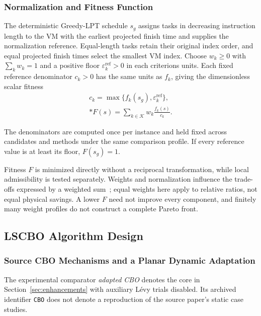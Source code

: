 \documentclass[pdflatex,onecolumn,sn-mathphys-num]{sn-jnl}
\begin{document}
\begin{samepage}
\subsubsection{Normalization and Fitness Function}\label{sec:fitness}
The deterministic Greedy-LPT schedule $s_g$ assigns tasks in decreasing instruction length to the VM with the earliest projected finish time and supplies the normalization reference. Equal-length tasks retain their original index order, and equal projected finish times select the smallest VM index. Choose $w_k\geq0$ with $\sum_k w_k=1$ and a positive floor $\varepsilon_k^{\mathrm{ref}}>0$ in each criterion\textquotesingle s units. Each fixed reference denominator $c_k>0$ has the same units as $f_k$, giving the dimensionless scalar fitness
\begin{gather}
c_k=\max\{f_k(s_g),\varepsilon_k^{\mathrm{ref}}\},\label{eq:reference}\\*
F(s)=\sum_{k\in\mathcal{K}}w_k\frac{f_k(s)}{c_k}.\label{eq:objective}
\end{gather}
\end{samepage}

The denominators are computed once per instance and held fixed across candidates and methods under the same comparison profile. If every reference value is at least its floor, $F(s_g)=1$.

Fitness $F$ is minimized directly without a reciprocal transformation, while local admissibility is tested separately. Weights and normalization influence the trade-offs expressed by a weighted sum~\cite{MarlerArora2010}; equal weights here apply to relative ratios, not equal physical savings. A lower $F$ need not improve every component, and finitely many weight profiles do not construct a complete Pareto front.

\subsection{LSCBO Algorithm Design}\label{sec:algorithm}

\subsubsection{Source CBO Mechanisms and a Planar Dynamic Adaptation}\label{sec:original_cbo}
The experimental comparator \emph{adapted CBO} denotes the core in Section~\ref{sec:enhancements} with auxiliary L\'{e}vy trials disabled. Its archived identifier \texttt{CBO} does not denote a reproduction of the source paper's static case studies.
\end{document}

